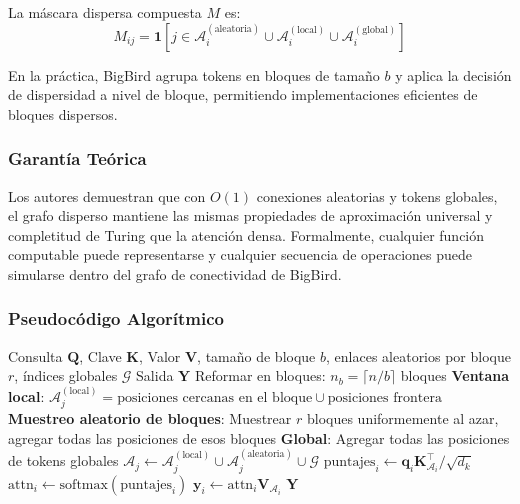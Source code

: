 \documentclass[11pt,a4paper]{article}
\begin{document}
La máscara dispersa compuesta $M$ es:
\[
M_{ij} = \mathbf{1}[j \in \mathcal{A}_i^{(\text{aleatoria})} \cup \mathcal{A}_i^{(\text{local})} \cup \mathcal{A}_i^{(\text{global})}]
\]

En la práctica, BigBird agrupa tokens en bloques de tamaño $b$ y aplica la decisión de dispersidad a nivel de bloque, permitiendo implementaciones eficientes de bloques dispersos.

\subsubsection{Garantía Teórica}

Los autores demuestran que con $O(1)$ conexiones aleatorias y tokens globales, el grafo disperso mantiene las mismas propiedades de aproximación universal y completitud de Turing que la atención densa. Formalmente, cualquier función computable puede representarse y cualquier secuencia de operaciones puede simularse dentro del grafo de conectividad de BigBird.

\subsubsection{Pseudocódigo Algorítmico}

\begin{algorithm}[H]
\caption{BigBird: Atención Dispersa por Bloques Aleatoria + Local + Global}
\begin{algorithmic}[1]
\Require Consulta $\mathbf{Q}$, Clave $\mathbf{K}$, Valor $\mathbf{V}$, tamaño de bloque $b$, enlaces aleatorios por bloque $r$, índices globales $\mathcal{G}$
\Ensure Salida $\mathbf{Y}$
\State Reformar en bloques: $n_b = \lceil n / b \rceil$ bloques
        \State \textbf{Ventana local}: $\mathcal{A}_j^{(\text{local})} = \text{posiciones cercanas en el bloque} \cup \text{posiciones frontera}$
        \State \textbf{Muestreo aleatorio de bloques}: Muestrear $r$ bloques uniformemente al azar, agregar todas las posiciones de esos bloques
        \State \textbf{Global}: Agregar todas las posiciones de tokens globales
        \State $\mathcal{A}_j \gets \mathcal{A}_j^{(\text{local})} \cup \mathcal{A}_j^{(\text{aleatoria})} \cup \mathcal{G}$
    \EndFor
\EndFor
{}
    \State $\text{puntajes}_i \gets \mathbf{q}_i \mathbf{K}_{\mathcal{A}_i}^\top / \sqrt{d_k}$
    \State $\text{attn}_i \gets \text{softmax}(\text{puntajes}_i)$
    \State $\mathbf{y}_i \gets \text{attn}_i \mathbf{V}_{\mathcal{A}_i}$
\EndFor
\Return $\mathbf{Y}$
\end{algorithmic}
\end{algorithm}
\end{document}
